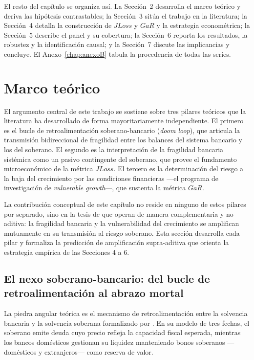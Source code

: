 El resto del capítulo se organiza así. La Sección~2 desarrolla el marco teórico y deriva las hipótesis contrastables; la Sección~3 sitúa el trabajo en la literatura; la Sección~4 detalla la construcción de $JLoss$ y $GaR$ y la estrategia econométrica; la Sección~5 describe el panel y su cobertura; la Sección~6 reporta los resultados, la robustez y la identificación causal; y la Sección~7 discute las implicancias y concluye. El Anexo~\ref{chap:anexoB} tabula la procedencia de todas las series.

\section{Marco teórico}

El argumento central de este trabajo se sostiene sobre tres pilares teóricos que la literatura ha desarrollado de forma mayoritariamente independiente. El primero es el bucle de retroalimentación soberano-bancario (\textit{doom loop}), que articula la transmisión bidireccional de fragilidad entre los balances del sistema bancario y los del soberano. El segundo es la interpretación de la fragilidad bancaria sistémica como un pasivo contingente del soberano, que provee el fundamento microeconómico de la métrica $JLoss$. El tercero es la determinación del riesgo a la baja del crecimiento por las condiciones financieras —el programa de investigación de \textit{vulnerable growth}—, que sustenta la métrica $GaR$.

La contribución conceptual de este capítulo no reside en ninguno de estos pilares por separado, sino en la tesis de que operan de manera complementaria y no aditiva: la fragilidad bancaria y la vulnerabilidad del crecimiento se amplifican mutuamente en su transmisión al riesgo soberano. Esta sección desarrolla cada pilar y formaliza la predicción de amplificación supra-aditiva que orienta la estrategia empírica de las Secciones 4 a 6.

\subsection{El nexo soberano-bancario: del bucle de retroalimentación al abrazo mortal}

La piedra angular teórica es el mecanismo de retroalimentación entre la solvencia bancaria y la solvencia soberana formalizado por \citet{FarhiTirole2018b}. En su modelo de tres fechas, el soberano emite deuda cuyo precio refleja la capacidad fiscal esperada, mientras los bancos domésticos gestionan su liquidez manteniendo bonos soberanos —domésticos y extranjeros— como reserva de valor.

